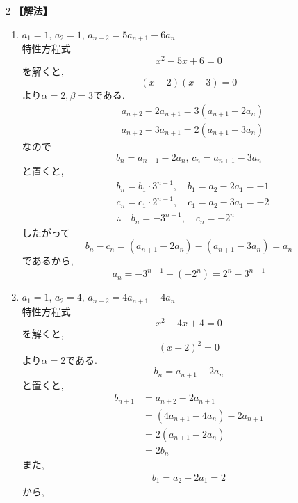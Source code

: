 \documentclass[dvipdfmx,a4paper,11pt,fleqn,openany]{jsbook}
\begin{document}
\begin{multicols*}{2}
      \noindent\textbf{【解法】}
      \begin{enumerate}[label=(\arabic*),parsep=3pt]
        \item $\displaystyle a_1=1,\,a_2=1,\, a_{n+2}=5a_{n+1}-6a_n$\\
              特性方程式
              \[
                x^2-5x+6=0
              \]
              を解くと,
              \[
                (x-2)(x-3)=0
              \]
              より$\alpha=2,\beta=3$である.
              \begin{align*}
                &a_{n+2}-2a_{n+1}=3(a_{n+1}-2a_n)\\
                &a_{n+2}-3a_{n+1}=2(a_{n+1}-3a_n)
              \end{align*}
              なので
              \[
                b_n=a_{n+1}-2a_n,\,c_n=a_{n+1}-3a_n
              \]
              と置くと,
              \begin{align*}
                &b_n=b_1\cdot3^{n-1},\quad b_1=a_2-2a_1=-1\\
                &c_n=c_1\cdot2^{n-1},\quad c_1=a_2-3a_1=-2\\
                &\therefore \quad b_n=-3^{n-1},\quad c_n=-2^n
              \end{align*}
              したがって
              \[
                b_n-c_n=(a_{n+1}-2a_n)-(a_{n+1}-3a_n)=a_n
              \]
              であるから,
              \[
                a_n=-3^{n-1}-(-2^n)=2^n-3^{n-1}
              \]
        \item $\displaystyle a_1=1,\,a_2=4,\, a_{n+2}=4a_{n+1}-4a_n$\\
              特性方程式
              \[
                x^2-4x+4=0
              \]
              を解くと,
              \[
                (x-2)^2=0
              \]
              より$\alpha=2$である.
              \[
                b_n=a_{n+1}-2a_n
              \]
              と置くと,
              \begin{align*}
                b_{n+1}&=a_{n+2}-2a_{n+1}\\
                &=(4a_{n+1}-4a_n)-2a_{n+1}\\
                &=2(a_{n+1}-2a_n)\\
                &=2b_n
              \end{align*}
              また,
              \begin{align*}
                b_1=a_2-2a_1=2
              \end{align*}
              から,
              \[
\]
\end{enumerate}
\end{multicols*}
\end{document}

